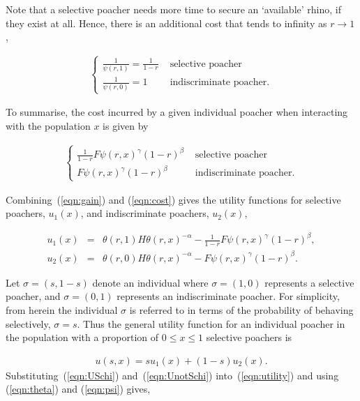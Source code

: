 \documentclass[10pt]{article}
\begin{document}
Note that a selective poacher needs
more time to secure an `available' rhino, if they exist at all. Hence, there is
an additional cost that tends to infinity as \(r \rightarrow 1\),

\begin{eqnarray}
    \label{eqn:selective_cost}
    \left\{
    \begin{array}{cl}
    \frac{1}{\psi(r, 1)} = \frac{1}{1 - r} & \mbox{ selective poacher}
    \\
    \frac{1}{\psi(r, 0)} = 1 & \mbox{ indiscriminate poacher.}
    \end{array} \right.
\end{eqnarray}

To summarise, the cost incurred by a given individual poacher when interacting
with the population \(x\) is given by 

\begin{eqnarray}
    \label{eqn:cost}
    \left\{
    \begin{array}{cl}
    \frac{1}{1 - r}  F\psi(r, x)^{\gamma} (1-r)^{\beta}& \mbox{ selective poacher}
    \\
    F\psi(r, x)^{\gamma} (1-r)^{\beta}& \mbox{ indiscriminate poacher.}
    \end{array} \right.
\end{eqnarray}

\noindent Combining~(\ref{eqn:gain}) and (\ref{eqn:cost}) gives the utility functions for
selective poachers, \(u_1(x)\), and indiscriminate poachers, \(u_2(x)\), 

\begin{eqnarray} 
\label{eqn:USchi}
u_1(x) &=& \theta(r,1) H \theta(r,x)^{-\alpha}
- \frac{1}{1- r} F\psi(r, x)^{\gamma} (1-r)^{\beta} ,
\\
\label{eqn:UnotSchi}
u_2(x) &=& \theta(r,0) H \theta(r,x)^{-\alpha}
- F\psi(r, x)^{\gamma}  (1-r)^{\beta}.
\end{eqnarray}


Let \(\sigma=(s, 1 - s)\) denote an individual where \(\sigma =(1, 0)\) represents
a selective poacher, and \(\sigma=(0, 1)\) represents an indiscriminate poacher.
For simplicity, from herein the individual \(\sigma\) is referred to in terms
of the probability of behaving selectively, \(\sigma=s\).
Thus the general utility function for an individual poacher in the population with
a proportion of \(0 \leq x \leq 1\) selective poachers is

\begin{eqnarray}
\label{eqn:utility}
u(s, x) = s u_1(x) +(1 - s) u_2(x).
\end{eqnarray}
Substituting~(\ref{eqn:USchi}) and~(\ref{eqn:UnotSchi}) into~(\ref{eqn:utility}) 
and using (\ref{eqn:theta}) and (\ref{eqn:psi}) gives,
\end{document}
